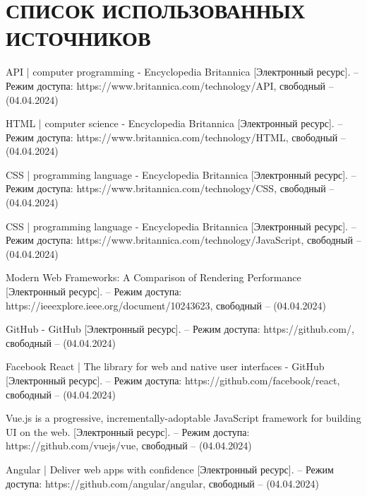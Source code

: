 \section*{СПИСОК ИСПОЛЬЗОВАННЫХ ИСТОЧНИКОВ}

\begingroup
\renewcommand{\section}[2]{}
\begin{thebibliography}{}
	
	API | computer programming - Encyclopedia Britannica [Электронный ресурс]. – Режим доступа: https://www.britannica.com/technology/API,
	свободный – (04.04.2024)
	
	HTML | computer science - Encyclopedia Britannica [Электронный ресурс]. – Режим доступа: https://www.britannica.com/technology/HTML,
	свободный – (04.04.2024)
	
	CSS | programming language - Encyclopedia Britannica [Электронный ресурс]. – Режим доступа: https://www.britannica.com/technology/CSS,
	свободный – (04.04.2024)
	
	CSS | programming language - Encyclopedia Britannica [Электронный ресурс]. – Режим доступа: https://www.britannica.com/technology/JavaScript,
	свободный – (04.04.2024)
	
	Modern Web Frameworks: A Comparison of Rendering Performance [Электронный ресурс]. – Режим доступа: https://ieeexplore.ieee.org/document/10243623,
	свободный – (04.04.2024)
	
	GitHub - GitHub [Электронный ресурс]. – Режим доступа: https://github.com/,
	свободный – (04.04.2024)
	
	Facebook React | The library for web and native user interfaces - GitHub [Электронный ресурс]. – Режим доступа: https://github.com/facebook/react,
	свободный – (04.04.2024)
	
	Vue.js is a progressive, incrementally-adoptable JavaScript framework for building UI on the web. [Электронный ресурс]. – Режим доступа: https://github.com/vuejs/vue,
	свободный – (04.04.2024)
		
	Angular | Deliver web apps with confidence [Электронный ресурс]. – Режим доступа: https://github.com/angular/angular,
	свободный – (04.04.2024)
	

\end{thebibliography}
